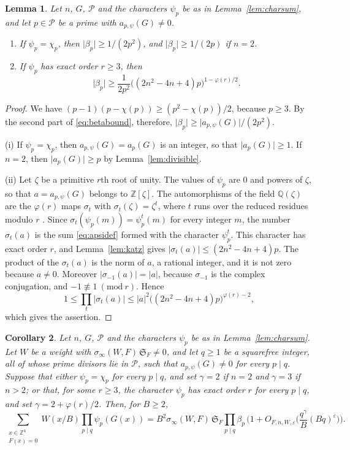 \documentclass[11pt]{amsart}
\numberwithin{equation}{section}
\numberwithin{figure}{section}
\newtheorem{lemma}{Lemma}[section]
\newtheorem{corollary}[lemma]{Corollary}
\theoremstyle{definition}
\newcommand{\Z}{\mathbb{Z}}
\newcommand{\Q}{\mathbb{Q}}
\newcommand{\F}{\mathcal{F}}
\newcommand{\imod}[1]{\ (\mathrm{mod}\ #1)}
\renewcommand{\S}{\mathfrak{S}}
\newcommand{\eps}{\varepsilon}
\newcommand{\abs}[1]{\lvert #1\rvert}
\begin{document}
\begin{lemma}\label{lem:lowerbeta}
Let $n$, $G$, $\mathcal P$ and the characters $\psi_p$ be as in
Lemma~\ref{lem:charsum}, and let $p\in\mathcal P$ be a prime with
$a_{p,\psi}(G)\ne0$.
\begin{enumerate}
\item[\textup{(i)}] If $\psi_p=\chi_p$, then
$\abs{\beta_p}\ge1/(2p^2)$, and $\abs{\beta_p}\ge1/(2p)$ if $n=2$.
\item[\textup{(ii)}] If $\psi_p$ has exact order $r\ge3$, then
\[
 \abs{\beta_p}\ge\frac1{2p^2}\big((2n^2-4n+4)p\big)^{1-\varphi(r)/2}.
\]
\end{enumerate}
\end{lemma}

\begin{proof}
We have $(p-1)(p-\chi(p))\ge(p^2-\chi(p))/2$, because $p\ge3$. By
the second part of \eqref{eq:betabound}, therefore,
$\abs{\beta_p}\ge\abs{a_{p,\psi}(G)}/(2p^2)$.

(i) If $\psi_p=\chi_p$, then $a_{p,\psi}(G)=a_p(G)$ is an integer, so
that $\abs{a_p(G)}\ge1$. If $n=2$, then $\abs{a_p(G)}\ge p$ by
Lemma~\ref{lem:divisible}.

(ii) Let $\zeta$ be a primitive $r$th root of unity. The values of
$\psi_p$ are $0$ and powers of $\zeta$, so that
$a=a_{p,\psi}(G)$ belongs to $\Z[\zeta]$. The automorphisms of the
field $\Q(\zeta)$ are the $\varphi(r)$ maps $\sigma_t$ with
$\sigma_t(\zeta)=\zeta^t$, where $t$ runs over the reduced residues
modulo $r$ \cite[Chapter~VI, Theorem~3.1]{La}. Since
$\sigma_t(\psi_p(m))=\psi_p^t(m)$ for every integer $m$, the number
$\sigma_t(a)$ is the sum \eqref{eq:apsidef} formed with the character
$\psi_p^t$. This character has exact order $r$, and
Lemma~\ref{lem:katz} gives $\abs{\sigma_t(a)}\le(2n^2-4n+4)p$. The
product of the $\sigma_t(a)$ is the norm of $a$, a rational integer,
and it is not zero because $a\ne0$. Moreover
$\abs{\sigma_{-1}(a)}=\abs a$, because $\sigma_{-1}$ is the complex
conjugation, and $-1\not\equiv1\imod r$. Hence
\[
 1\le\prod_t\abs{\sigma_t(a)}\le\abs a^2\big((2n^2-4n+4)p\big)^{\varphi(r)-2},
\]
which gives the assertion.
\end{proof}

\begin{corollary}\label{cor:relative}
Let $n$, $G$, $\mathcal P$ and the characters $\psi_p$ be as in
Lemma~\ref{lem:charsum}. Let $W$ be a weight with
$\sigma_\infty(W,F)\,\S_F\ne0$, and let $q\ge1$ be a squarefree
integer, all of whose prime divisors lie in $\mathcal P$, such that
$a_{p,\psi}(G)\ne0$ for every $p\mid q$. Suppose that either
$\psi_p=\chi_p$ for every $p\mid q$, and set $\gamma=2$ if $n=2$ and
$\gamma=3$ if $n>2$; or that, for some $r\ge3$, the character
$\psi_p$ has exact order $r$ for every $p\mid q$, and set
$\gamma=2+\varphi(r)/2$. Then, for $B\ge2$,
\begin{equation}\label{eq:relative}
 \sum_{\substack{x\in\Z^4\\F(x)=0}}W(x/B)\prod_{p\mid q}\psi_p(G(x))
 =B^2\sigma_\infty(W,F)\,\S_F\prod_{p\mid q}\beta_p\,
 \bigg(1+O_{F,n,W,\eps}\Big(\frac{q^\gamma}B(Bq)^\eps\Big)\bigg).
\end{equation}
\end{corollary}
\end{document}
